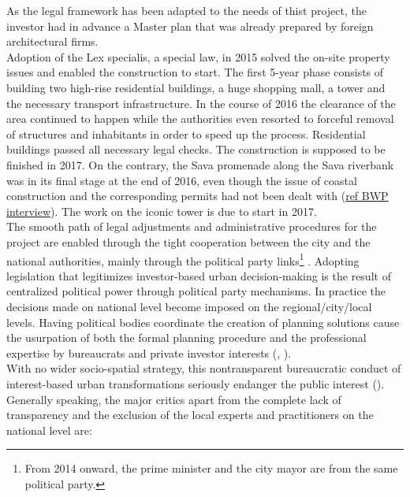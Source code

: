 \documentclass[11pt]{report}
\begin{document}
\begin{itemize}
As the legal framework has been adapted to the needs of thist project, the investor had in advance a Master plan that was already prepared by foreign architectural firms.
\\
Adoption of the Lex specialis, a special law, in 2015 solved the on-site property issues and enabled the construction to start.
The first 5-year phase consists of building two high-rise residential buildings, a huge shopping mall, a tower and the necessary transport infrastructure. 
In the course of 2016 the clearance of the area continued to happen while the authorities even resorted to forceful removal of structures and inhabitants in order to speed up the process.
Residential buildings passed all necessary legal checks. The construction is supposed to be finished in 2017.
On the contrary, the Sava promenade along the Sava riverbank was in its final stage at the end of 2016, even though the issue of coastal construction and the corresponding permits had not been dealt with (\href{}{ref BWP interview}).
The work on the iconic tower is due to start in 2017.
\\
The smooth path of legal adjustments and administrative procedures for the project are enabled through the tight cooperation between the city and the national authorities, mainly through the political party links\footnote{From 2014 onward, the prime minister and the city mayor are from the same political party.}
\cite{Maruna 2015, Peric 2016}.
Adopting legislation that legitimizes investor-based urban decision-making is the result of centralized political power through political party mechanisms.
In practice the decisions made on national level become imposed on the regional/city/local levels.
Having political bodies coordinate the creation of planning solutions cause the usurpation of both the formal planning procedure and the professional expertise by bureaucrats and private investor interests (\href{}{\cite{Maruna 2015}}, \href{}{\citealt{peric_evolution_2016}}).
\\
With no wider socio-spatial strategy, this nontransparent bureaucratic conduct of interest-based urban transformations seriously endanger the public interest (\cite{Vukmirovic in Doytchinov et al 2015}). 
Generally speaking, the major critics apart from the complete lack of transparency and the exclusion of the local experts and practitioners on the national level are:


\end{itemize}
\end{document}
